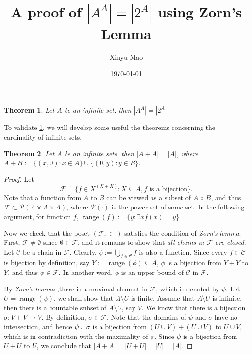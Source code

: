 \documentclass[12pt]{article}
\title{A proof of $|A^A| = |2^A| $ using Zorn's Lemma}
\author{Xinyu Mao}
\date{\today}
\theoremstyle{mythm}
\newtheorem{theorem}{Theorem}
\newcommand\cc{\mathcal{C}}
\newcommand\pp{\mathcal{P}}
\newcommand\ff{\mathcal{F}}
\DeclareMathOperator{\range}{range}
\begin{document}
\maketitle

\begin{tcolorbox}
\begin{theorem} \label{main}
    Let $A$ be an infinite set, then $|A^A| = |2^A|$.
\end{theorem}
\end{tcolorbox}
To validate \cref{main}, we will develop some useful the theorems concerning 
the cardinality of infinite sets.

\begin{theorem} \label{helper1}
    Let $A$ be an infinite sets, then $|A + A| = |A|$,
    where $A + B := \{(x,0):x \in A\} \cup \{(0,y) : y \in B\}$.
\end{theorem}  

\begin{proof}
    Let 
    $$
    \ff = \{f \in X^{(X + X)} : X \subseteq A, f \text{ is a bijection}\}.
    $$
    Note that a function from $A$ to $B$ can be viewed as 
    a subset of $A \times B$, and thus $\ff \subset \pp(A \times A \times A)$,
    where $\pp(\cdot)$ is the power set of some set. 
    In the following argument, for function $f$, $\range(f) := \{y:\exists x f(x) = y\}$
    
    Now we check that the poset $(\ff, \subset)$ satisfies
    the condition of \textit{Zorn's lemma}. 
    First, $\ff \neq \emptyset$ since $\emptyset \in \ff$,
    and it remains to show that \textit{all chains in $\ff$ are closed}.
    Let $\cc$ be a chain in $\ff$. 
    Clearly, $\phi := \bigcup_{f \in \cc} f$ is also a
    function. Since every $f \in \cc$ is bijection by definition, 
    say $Y := \range(\phi) \subseteq A$, $\phi$ is a bijection from $Y + Y$ to $Y$,
    and thus $\phi \in \ff$.
    In another word, $\phi$ is an upper bound of $\cc$ in $\ff$. 

    By \textit{Zorn's lemma} ,there is a maximal element in $\ff$,
    which is denoted by $\psi$. Let $U = \range(\psi)$, we shall
    show that $A\setminus U$ is finite. Assume that $A\setminus U$
    is infinite, then there is a countable subset of $A\setminus U$,
    say $V$. We know that there is a bijection $\sigma : V + V \to V$.
    By definition, $\sigma \in \ff$. 
    Note that the domains of $\psi$ and $\sigma$ have no intersection, 
    and hence $\psi \cup \sigma$ is a bijection from $(U \cup V) + (U \cup V)$ to $U \cup V$, 
    which is in contradiction with the maximality of $\psi$.
    Since $\psi$ is a bijection from $U + U $ to $U$,
    we conclude that $|A + A| = |U + U| = |U| = |A|$.
\end{proof}     
\end{document}
